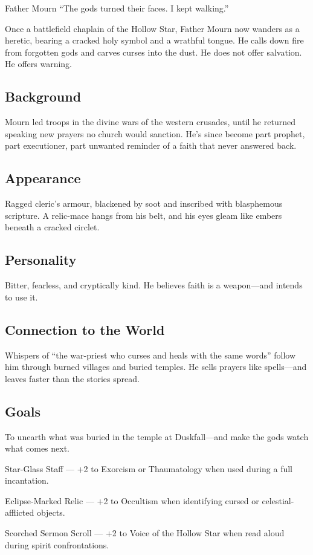 \newpage
\begin{WyrdCharacterSheet}
    {Father Mourn}
    {“The gods turned their faces. I kept walking.”}
    \label{pc:father-mourn}

    Once a battlefield chaplain of the Hollow Star, Father Mourn now wanders as a heretic, bearing a cracked holy symbol and a wrathful tongue. He calls down fire from forgotten gods and carves curses into the dust. He does not offer salvation. He offers warning.

    \subsection{Background}
    Mourn led troops in the divine wars of the western crusades, until he returned speaking new prayers no church would sanction. He’s since become part prophet, part executioner, part unwanted reminder of a faith that never answered back.

    \subsection{Appearance}
    Ragged cleric’s armour, blackened by soot and inscribed with blasphemous scripture. A relic-mace hangs from his belt, and his eyes gleam like embers beneath a cracked circlet.

    \subsection{Personality}
    Bitter, fearless, and cryptically kind. He believes faith is a weapon—and intends to use it.

    \subsection{Connection to the World}
    Whispers of “the war-priest who curses and heals with the same words” follow him through burned villages and buried temples. He sells prayers like spells—and leaves faster than the stories spread.

    \subsection{Goals}
    To unearth what was buried in the temple at Duskfall—and make the gods watch what comes next.

    \vspace{0.5\baselineskip}
    \begin{GearBox}
        \item[Star-Glass Staff] — +2 to Exorcism or Thaumatology when used during a full incantation.
        \item[Eclipse-Marked Relic] — +2 to Occultism when identifying cursed or celestial-afflicted objects.
        \item[Scorched Sermon Scroll] — +2 to Voice of the Hollow Star when read aloud during spirit confrontations.
    \end{GearBox}


\end{WyrdCharacterSheet}
